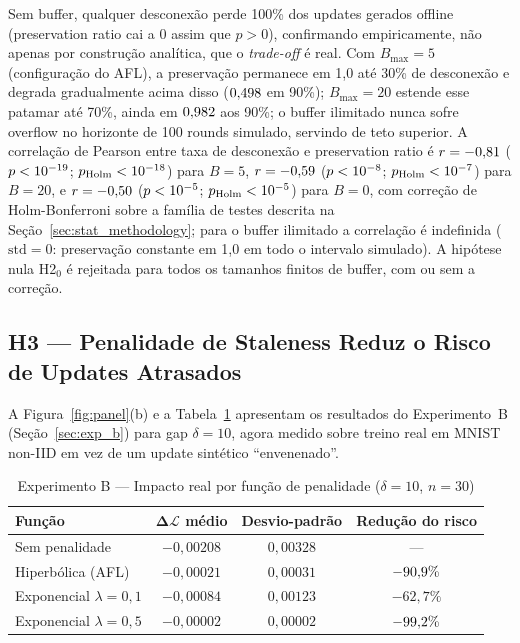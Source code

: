 \documentclass[conference,a4paper]{IEEEtran}
\begin{document}
Sem buffer, qualquer desconexão perde 100\% dos updates gerados offline
(preservation ratio cai a 0 assim que $p>0$), confirmando empiricamente,
não apenas por construção analítica, que o \textit{trade-off} é real. Com
$B_{\max}=5$ (configuração do AFL), a preservação permanece em 1,0 até 30\%
de desconexão e degrada gradualmente acima disso
($0{,}498$ em 90\%);
$B_{\max}=20$ estende esse patamar até 70\%, ainda em
$0{,}982$ aos 90\%; o
buffer ilimitado nunca sofre overflow no horizonte de 100 rounds simulado,
servindo de teto superior. A correlação de Pearson entre taxa de
desconexão e preservation ratio é $r=-0{,}81$ ($p<10^{-19}$;
$p_{\text{Holm}}<10^{-18}$) para $B{=}5$,
$r=-0{,}59$ ($p<10^{-8}$; $p_{\text{Holm}}<10^{-7}$)
para $B{=}20$, e $r=-0{,}50$ ($p<10^{-5}$; $p_{\text{Holm}}<10^{-5}$)
para $B{=}0$, com correção de Holm-Bonferroni sobre a família de
\statHolmFamilySize{} testes descrita na Seção~\ref{sec:stat_methodology};
para o buffer ilimitado a correlação é indefinida
($\text{std}=0$: preservação constante em 1,0 em todo o intervalo
simulado). A hipótese nula H2$_0$ é rejeitada para todos os tamanhos
finitos de buffer, com ou sem a correção.

\subsection{H3 --- Penalidade de Staleness Reduz o Risco de Updates Atrasados}

A Figura~\ref{fig:panel}(b) e a Tabela~\ref{tab:results_b} apresentam os
resultados do Experimento~B (Seção~\ref{sec:exp_b}) para gap $\delta=10$,
agora medido sobre treino real em MNIST non-IID em vez de um update
sintético ``envenenado''.

\begin{table}[H]
\centering
\caption{Experimento B --- Impacto real por função de penalidade ($\delta=10$, $n=30$)}
\label{tab:results_b}
\small
\begin{tabular}{@{}lccc@{}}
\toprule
\textbf{Função} & $\mathbf{\Delta\mathcal{L}}$ \textbf{médio} & \textbf{Desvio-padrão} & \textbf{Redução do risco} \\
\midrule
Sem penalidade              & $-0{,}00208$ & $0{,}00328$ & --- \\
Hiperbólica (AFL)           & $-0{,}00021$ & $0{,}00031$ & $-90{,}9\%$ \\
Exponencial $\lambda{=}0{,}1$ & $-0{,}00084$ & $0{,}00123$ & $-62{,}7\%$ \\
Exponencial $\lambda{=}0{,}5$ & $-0{,}00002$ & $0{,}00002$ & $-99{,}2\%$ \\
\bottomrule
\end{tabular}
\end{table}
\end{document}
